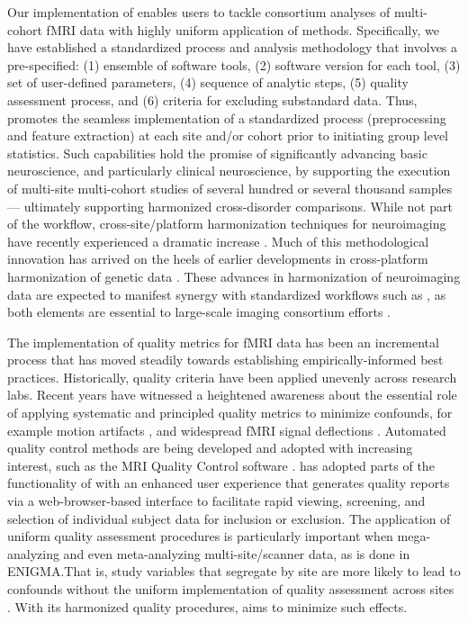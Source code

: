 Our implementation of  enables users to tackle consortium analyses of multi-cohort fMRI data with highly uniform application of methods. Specifically, we have established a standardized process and analysis methodology that involves a pre-specified: (1) ensemble of software tools, (2) software version for each tool, (3) set of user-defined parameters, (4) sequence of analytic steps, (5) quality assessment process, and (6) criteria for excluding substandard data. Thus,  promotes the seamless implementation of a standardized process (preprocessing and feature extraction) at each site and/or cohort prior to initiating group level statistics. Such capabilities hold the promise of significantly advancing basic neuroscience, and particularly clinical neuroscience, by supporting the execution of multi-site multi-cohort studies of several hundred or several thousand samples --- ultimately supporting harmonized cross-disorder comparisons. While not part of the  workflow, cross-site/platform harmonization techniques for neuroimaging have recently experienced a dramatic increase \parencite{pezoulas2020b,fortin2018,wachinger2021}. Much of this methodological innovation has arrived on the heels of earlier developments in cross-platform harmonization of genetic data \parencite{borisov2019,johnson2007,pontikos2017,haghverdi2018}. These advances in harmonization of neuroimaging data are expected to manifest synergy with standardized workflows such as , as both elements are essential to large-scale imaging consortium efforts \parencite{thompson2020a}.

The implementation of quality metrics for fMRI data has been an incremental process that has moved steadily towards establishing empirically-informed best practices. Historically, quality criteria have been applied unevenly across research labs. Recent years have witnessed a heightened awareness about the essential role of applying systematic and principled quality metrics to minimize confounds, for example motion artifacts \parencite{power2012,power2014,murphy2013}, and widespread fMRI signal deflections \parencite{aquino2020}. Automated quality control methods are being developed and adopted with increasing interest, such as the MRI Quality Control software  \parencite{esteban2017}.  has adopted parts of the functionality of  with an enhanced user experience that generates quality reports via a web-browser-based interface to facilitate rapid viewing, screening, and selection of individual subject data for inclusion or exclusion. The application of uniform quality assessment procedures is particularly important when mega-analyzing and even meta-analyzing multi-site/scanner data, as is done in ENIGMA.\@ That is, study variables that segregate by site are more likely to lead to confounds without the uniform implementation of quality assessment across sites \parencite[e.g.,][]{wachinger2021}. With its harmonized quality procedures,  aims to minimize such effects.

